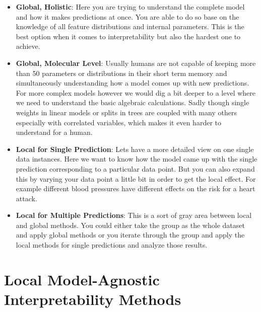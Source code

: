 \documentclass[11pt,
  a4paper,
  parskip=half, %
  BCOR=10mm, %
  english,
  ]{article}
\begin{document}
\begin{itemize}
    \item \textbf{Global, Holistic}: Here you are trying to understand the complete model and how it makes predictions at once. 
    You are able to do so base on the knowledge of all feature distributions and internal parameters. This is the best option when it comes 
    to interpretability but also the hardest one to achieve. \cite{molnar2022}
    \item \textbf{Global, Molecular Level}: Usually humans are not capable of keeping more than 50 parameters or distributions in their 
    short term memory and simultaneously understanding how a model comes up with new predictions. 
    For more complex models however we would dig a bit deeper to a level where we need to understand the basic algebraic calculations. 
    Sadly though single weights in linear models or splits in trees are coupled with many others especially with correlated variables, which makes it even harder to understand for a human. \cite{molnar2022}
    \item \textbf{Local for Single Prediction}: Lets have a more detailed view on one single data instances. Here we want to know how the model
    came up with the single prediction corresponding to a particular data point. But you can also expand this by varying your data point a
    little bit in order to get the local effect. For example different blood pressures have different effects on the risk for a heart attack.\cite{molnar2022}
    \item \textbf{Local for Multiple Predictions}: This is a sort of gray area between local and global methods. You could either take the group as
    the whole dataset and apply global methods or you iterate through the group and apply the local methods for single predictions and analyze those results. \cite{molnar2022}
\end{itemize}


\section{Local Model-Agnostic Interpretability Methods}
\end{document}
